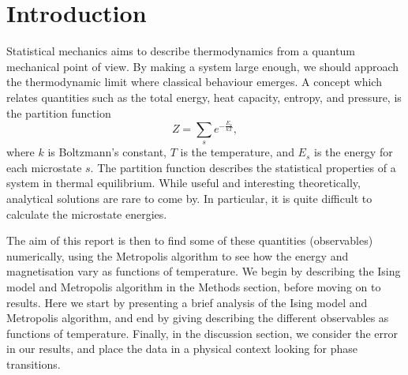 \section{Introduction}
\label{sec:introduction}

Statistical mechanics aims to describe thermodynamics from a quantum mechanical point of view.
By making a system large enough, we should approach the thermodynamic limit where classical behaviour emerges. A concept which relates quantities such as the total energy, heat capacity, entropy, and pressure, is the partition function
  \begin{equation}
    \label{eq:partition}
    Z = \sum_s e^{-\frac{E_s}{kT}},
  \end{equation}
where $k$ is Boltzmann's constant, $T$ is the temperature, and $E_s$ is the energy for each microstate $s$.
The partition function describes the statistical properties of a system in thermal equilibrium.
While useful and interesting theoretically, analytical solutions are rare to come by. In particular,
it is quite difficult to calculate the microstate energies.

The aim of this report is then to find some of these quantities (observables) numerically, using
the Metropolis algorithm to see how the energy and magnetisation vary as functions of temperature.
We begin by describing the Ising model and Metropolis algorithm in the Methods section, before moving on to results. Here we start by presenting a brief analysis of the Ising model and Metropolis algorithm, and end by giving describing the different observables as functions of temperature. Finally, in the discussion section, we consider the error in our results, and place the data in a physical context looking for phase transitions.
